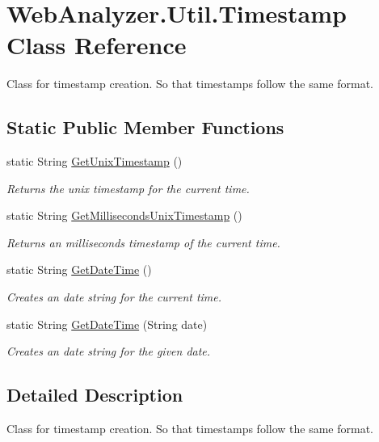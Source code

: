 \hypertarget{class_web_analyzer_1_1_util_1_1_timestamp}{}\section{Web\+Analyzer.\+Util.\+Timestamp Class Reference}
\label{class_web_analyzer_1_1_util_1_1_timestamp}


Class for timestamp creation. So that timestamps follow the same format.  


\subsection*{Static Public Member Functions}
\begin{DoxyCompactItemize}
\item 
static String \hyperlink{class_web_analyzer_1_1_util_1_1_timestamp_a444c15a3477e38b4b34850a0bd601a5d}{Get\+Unix\+Timestamp} ()
\begin{DoxyCompactList}\small\item\em Returns the unix timestamp for the current time. \end{DoxyCompactList}\item 
static String \hyperlink{class_web_analyzer_1_1_util_1_1_timestamp_ad90708976b5cebb0512e20ba0011dcdf}{Get\+Milliseconds\+Unix\+Timestamp} ()
\begin{DoxyCompactList}\small\item\em Returns an milliseconds timestamp of the current time. \end{DoxyCompactList}\item 
static String \hyperlink{class_web_analyzer_1_1_util_1_1_timestamp_a3f8fe9efc6a3f6a811d5b6af7e748ed7}{Get\+Date\+Time} ()
\begin{DoxyCompactList}\small\item\em Creates an date string for the current time. \end{DoxyCompactList}\item 
static String \hyperlink{class_web_analyzer_1_1_util_1_1_timestamp_a4040173245bf7cca4eb4d2879cdd0671}{Get\+Date\+Time} (String date)
\begin{DoxyCompactList}\small\item\em Creates an date string for the given date. \end{DoxyCompactList}\end{DoxyCompactItemize}


\subsection{Detailed Description}
Class for timestamp creation. So that timestamps follow the same format. 



